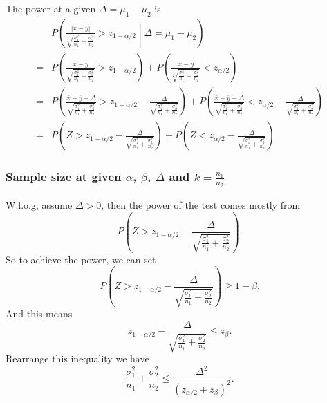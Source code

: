 \documentclass[a4paper,12pt]{article}
\begin{document}
The power at a given $\Delta = \mu_1 - \mu_2$ is
\[
  \begin{aligned}
    & P\left(
      \frac{\left|\bar{x} - \bar{y}\right|}{
      \sqrt{
      \frac{\sigma_1^2}{n_1} + \frac{\sigma_2^2}{n_2}
      }
      }
      > z_{1 - \alpha /2}
      \middle| \Delta = \mu_1 - \mu_2
      \right)    \\
    =& P\left(
       \frac{
       \bar{x} - \bar{y}
       }{
       \sqrt{
       \frac{\sigma_1^2}{n_1} + \frac{\sigma_2^2}{n_2}
       }
       }
       > z_{1 - \alpha / 2}
       \right)
       + P\left(
       \frac{
       \bar{x} - \bar{y}
       }{
       \sqrt{
       \frac{\sigma_1^2}{n_1} + \frac{\sigma_2^2}{n_2}
       }
       }
       < z_{\alpha / 2}
       \right)    \\
    =& P\left(
       \frac{
       \bar{x} - \bar{y}
       - \Delta
       }{
       \sqrt{
       \frac{\sigma_1^2}{n_1} + \frac{\sigma_2^2}{n_2}
       }
       }
       > z_{1 - \alpha / 2}
       - \frac{\Delta}{\sqrt{\frac{\sigma_1^2}{n_1} + \frac{\sigma_2^2}{n_2}}}
       \right)
       + P\left(
       \frac{
       \bar{x} - \bar{y} - \Delta
       }{
       \sqrt{
       \frac{\sigma_1^2}{n_1} + \frac{\sigma_2^2}{n_2}
       }
       }
       < z_{\alpha / 2}
       - \frac{\Delta}{\sqrt{\frac{\sigma_1^2}{n_1} + \frac{\sigma_2^2}{n_2}}}
       \right)    \\
    =& P\left(
       Z
       > z_{1 - \alpha / 2}
       - \frac{\Delta}{\sqrt{\frac{\sigma_1^2}{n_1} + \frac{\sigma_2^2}{n_2}}}
       \right)
       + P\left(
       Z
       < z_{\alpha / 2}
       - \frac{\Delta}{\sqrt{\frac{\sigma_1^2}{n_1} + \frac{\sigma_2^2}{n_2}}}
       \right)
  \end{aligned}
\]

\subsubsection{Sample size at given $\alpha$, $\beta$, $\Delta$ and $k = \frac{n_1}{n_2}$}
\label{sec:sample-size-at-2}

W.l.o.g, assume $\Delta > 0$, then the power of the test comes mostly from
\[
  P\left(
    Z
    > z_{1 - \alpha / 2}
    - \frac{\Delta}{\sqrt{\frac{\sigma_1^2}{n_1} + \frac{\sigma_2^2}{n_2}}}
  \right)
  .
\]
So to achieve the power, we can set
\[
  P\left(
    Z
    > z_{1 - \alpha / 2}
    - \frac{\Delta}{\sqrt{\frac{\sigma_1^2}{n_1} + \frac{\sigma_2^2}{n_2}}}
  \right)
  \geq 1 -\beta
  .
\]
And this means
\[
  z_{1 - \alpha / 2}
  - \frac{\Delta}{\sqrt{\frac{\sigma_1^2}{n_1} + \frac{\sigma_2^2}{n_2}}}
  \leq z_{\beta}
  .
\]
Rearrange this inequality we have
\[
  \frac{\sigma_1^2}{n_1} + \frac{\sigma_2^2}{n_2}
  \leq
  \frac{\Delta^2}{
    \left(
      z_{\alpha / 2} + z_{\beta}
    \right)^2
  }
  .
\]
\end{document}
